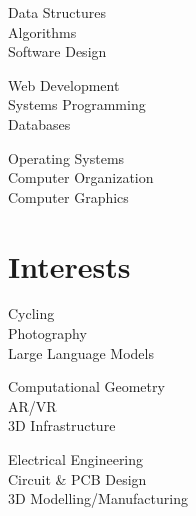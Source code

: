 \documentclass[letterpaper,11pt]{article}
\begin{document}
\begin{multicols}{3}
  \begin{flushleft}
    \small{
      Data Structures \\
      Algorithms \\
      Software Design
    }
  \end{flushleft}

  \begin{flushleft}
    \small{
      Web Development \\
      Systems Programming \\
      Databases
    }
  \end{flushleft}

  \begin{flushleft}
    \small{
      Operating Systems \\
      Computer Organization \\
      Computer Graphics
    }
  \end{flushleft}
\end{multicols}
\vspace{-10pt}

\section{Interests}
\begin{multicols}{3}
  \begin{flushleft}
    \small{
      Cycling \\
      Photography \\
      Large Language Models
    }
  \end{flushleft}

  \begin{flushleft}
    \small{
      Computational Geometry \\
      AR/VR \\
      3D Infrastructure
    }
  \end{flushleft}

  \begin{flushleft}
    \small{
      Electrical Engineering \\
      Circuit \& PCB Design \\
      3D Modelling/Manufacturing
    }
  \end{flushleft}
\end{multicols}
\vspace{-16pt}
\end{document}
